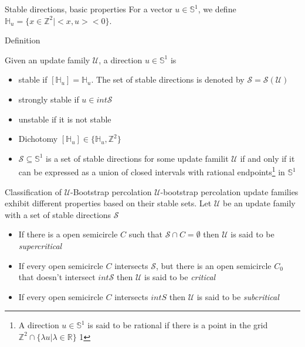 \begin{frame}{Stable directions, basic properties}
For a vector $u\in\mathbb{S}^1$, we define $
\mathbb{H}_u=\{x\in\mathbb{Z}^2|<x,u><0\}$.

\begin{block}{Definition}



Given an update family $\mathcal{U}$, a direction $u\in\mathbb{S}^1$ is
\begin{itemize}

    \item stable if $[\mathbb{H}_u]=\mathbb{H}_u$. The set of stable directions is denoted by $\mathcal{S}=\mathcal{S}(\mathcal{U})$
    \item strongly stable if $u\in int\mathcal{S}$
    \item unstable if it is not stable


\end{itemize}
\end{block}


\begin{itemize}
    \item Dichotomy $[\mathbb{H}_u]\in\{\mathbb{H}_u,\mathbb{Z}^2\}$
    \item $\mathcal{S}\subseteq\mathbb{S}^1$ is a set of stable directions for some update familit $\mathcal{U}$ if and only if it can be expressed as a union of closed intervals with rational endpoints\footnote{A direction $u\in\mathbb{S}^1$ is said to be rational if there is a point in the grid $\mathbb{Z}^2\cap\{\lambda u|\lambda\in\mathbb{R}\}$
    1}
    in $\mathbb{S}^1$
\end{itemize}



\end{frame}

\begin{frame}{Classification of $\mathcal{U}$-Bootstrap percolation}
$\mathcal{U}$-bootstrap percolation update families exhibit different properties based on their stable sets. Let $\mathcal{U}$ be an update family with a set of stable directions $\mathcal{S}$
\begin{block}

\begin{itemize}
    \item If there is a open semicircle $C$ such that $\mathcal{S}\cap C=\emptyset$ then $\mathcal{U}$ is said to be \emph{supercritical}
    \item If every open semicircle $C$ intersects $\mathcal{S}$, but there is an open semicircle $C_0$ that doesn't intersect $int\mathcal{S}$ then $\mathcal{U}$ is said to be \emph{critical}
    \item If every open semicircle $C$ intersects $int S$ then $\mathcal{U}$ is said to be \emph{subcritical}
\end{itemize}

\end{block}

\end{frame}

